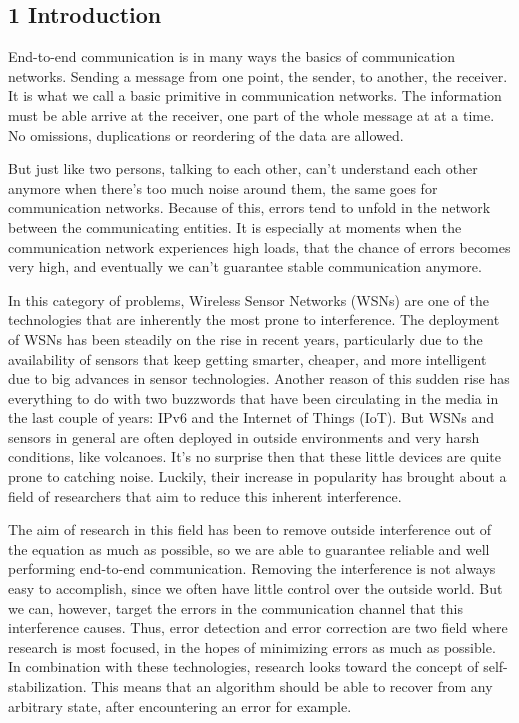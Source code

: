 \subsection{1 Introduction}\label{introduction}

End-to-end communication is in many ways the basics of communication
networks. Sending a message from one point, the sender, to another, the
receiver. It is what we call a basic primitive in communication
networks. The information must be able arrive at the receiver, one part
of the whole message at at a time. No omissions, duplications or
reordering of the data are allowed.

But just like two persons, talking to each other, can't understand each
other anymore when there's too much noise around them, the same goes for
communication networks. Because of this, errors tend to unfold in the
network between the communicating entities. It is especially at moments
when the communication network experiences high loads, that the chance
of errors becomes very high, and eventually we can't guarantee stable
communication anymore.

In this category of problems, Wireless Sensor Networks (WSNs) are one of
the technologies that are inherently the most prone to interference. The
deployment of WSNs has been steadily on the rise in recent years,
particularly due to the availability of sensors that keep getting
smarter, cheaper, and more intelligent due to big advances in sensor
technologies. Another reason of this sudden rise has everything to do
with two buzzwords that have been circulating in the media in the last
couple of years: IPv6 and the Internet of Things (IoT). But WSNs and
sensors in general are often deployed in outside environments and very
harsh conditions, like volcanoes\cite{1607983}. It's no surprise then
that these little devices are quite prone to catching noise. Luckily,
their increase in popularity has brought about a field of researchers
that aim to reduce this inherent interference.

The aim of research in this field has been to remove outside
interference out of the equation as much as possible, so we are able to
guarantee reliable and well performing end-to-end communication.
Removing the interference is not always easy to accomplish, since we
often have little control over the outside world. But we can, however,
target the errors in the communication channel that this interference
causes. Thus, error detection and error correction are two field where
research is most focused, in the hopes of minimizing errors as much as
possible. In combination with these technologies, research looks toward
the concept of self-stabilization. This means that an algorithm should
be able to recover from any arbitrary state, after encountering an error
for example.

